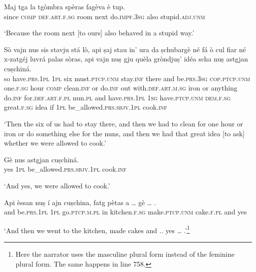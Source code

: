 \begin{linenumbers}
\gll    Maj tga la tgòmbra spèras fagèva è tup.\\
since \textsc{comp} \textsc{def.art.f.sg} room next do.\textsc{impf.3sg} also stupid.\textsc{adj.unm}\\
\end{linenumbers}
\medskip
\glt `Because the room next [to ours] also behaved in a stupid way.'
\medskip

\begin{linenumbers}
\gll Sò\footnotemark{} vajn nus sis stavju stá lò, api ṣaj stau in’ ura da ṣchubargè né fá ò cul fiar né x-zatgéj luvrá palas sòras, api vajn nuṣ gju quèla gròndjuṣ’ idéa scha nuṣ astgjan cuṣchiná.\\
so have.\textsc{prs.1pl} \textsc{1pl} six must.\textsc{ptcp.unm} stay.\textsc{inf} there and be.\textsc{prs.3sg} \textsc{cop.ptcp.unm} one.\textsc{f.sg} hour \textsc{comp} clean.\textsc{inf} or do.\textsc{inf} out with.\textsc{def.art.m.sg} iron or anything do.\textsc{inf} for.\textsc{def.art.f.pl} nun.\textsc{pl} and have.\textsc{prs.1pl} \textsc{1sg} have.\textsc{ptcp.unm} \textsc{dem.f.sg} great.\textsc{f.sg} idea if \textsc{1pl} be\_allowed.\textsc{prs.sbjv.1pl} cook.\textsc{inf}\\
\end{linenumbers}
\medskip
\glt `Then the six of us had to stay there, and then we had to clean for one hour or iron or do something else for the nuns, and then we had that great idea [to ask] whether we were allowed to cook.'
\medskip

\begin{linenumbers}
\gll    Gè nus\footnotemark{} astgjan cuṣchiná. \\
yes \textsc{1pl} be\_allowed.\textsc{prs.sbjv.1pl} cook.\textsc{inf}\\
\end{linenumbers}
\medskip
\glt `And yes, we were allowed to cook.'
\medskip

\begin{linenumbers}
\gll Api èssan nuṣ í\footnotemark{} ajn cuṣchina, fatg pètas a … gè … .\\
and be.\textsc{prs.1pl} \textsc{1pl} go.\textsc{ptcp.m.pl} in kitchen.\textsc{f.sg} make.\textsc{ptcp.unm} cake.\textsc{f.pl} and {} yes \\
\end{linenumbers}
\medskip
\glt `And then we went to the kitchen, made cakes and .. yes … .'\footnote{Here the narrator uses the masculine plural form instead of the feminine plural form. The same happens in line 758.}
\medskip

